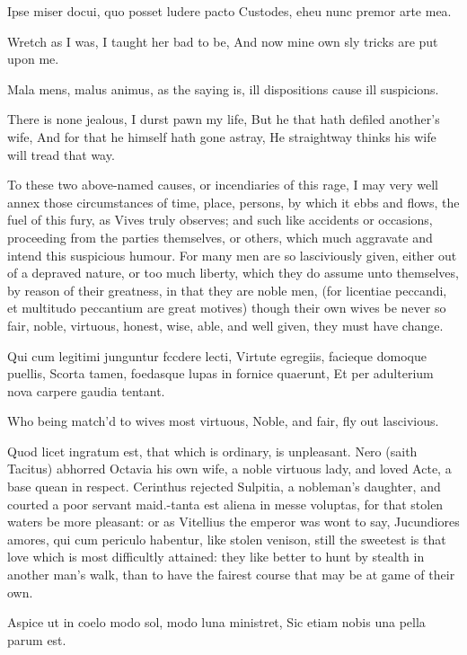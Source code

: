 {Ipse miser docui, quo posset ludere pacto
Custodes, eheu nunc premor arte mea.

Wretch as I was, I taught her bad to be,
And now mine own sly tricks are put upon me.

Mala mens, malus animus, as the saying is, ill dispositions cause ill
suspicions.

There is none jealous, I durst pawn my life,
But he that hath defiled another's wife,
And for that he himself hath gone astray,
He straightway thinks his wife will tread that way.

To these two above-named causes, or incendiaries of this rage, I may
very well annex those circumstances of time, place, persons, by which
it ebbs and flows, the fuel of this fury, as Vives truly
observes; and such like accidents or occasions, proceeding from the
parties themselves, or others, which much aggravate and intend this
suspicious humour. For many men are so lasciviously given, either out
of a depraved nature, or too much liberty, which they do assume unto
themselves, by reason of their greatness, in that they are noble men,
(for licentiae peccandi, et multitudo peccantium are great motives)
though their own wives be never so fair, noble, virtuous, honest, wise,
able, and well given, they must have change.

Qui cum legitimi junguntur fccdere lecti,
Virtute egregiis, facieque domoque puellis,
Scorta tamen, foedasque lupas in fornice quaerunt,
Et per adulterium nova carpere gaudia tentant.

Who being match'd to wives most virtuous,
Noble, and fair, fly out lascivious.

Quod licet ingratum est, that which is ordinary, is unpleasant. Nero
(saith Tacitus) abhorred Octavia his own wife, a noble virtuous lady,
and loved Acte, a base quean in respect. Cerinthus rejected
Sulpitia, a nobleman's daughter, and courted a poor servant maid.-tanta
est aliena in messe voluptas, for that stolen waters be more
pleasant: or as Vitellius the emperor was wont to say, Jucundiores
amores, qui cum periculo habentur, like stolen venison, still the
sweetest is that love which is most difficultly attained: they like
better to hunt by stealth in another man's walk, than to have the
fairest course that may be at game of their own.

Aspice ut in coelo modo sol, modo luna ministret,
Sic etiam nobis una pella parum est.

}
